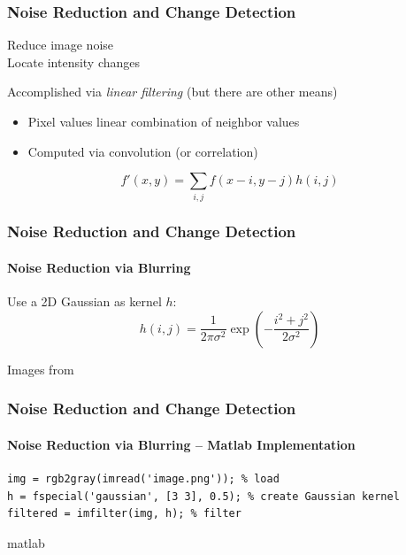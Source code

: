\documentclass[xetex,professionalfont]{beamer}
\begin{document}

\begin{frame}
\frametitle{Noise Reduction and Change Detection}

Reduce image noise\\\medskip
Locate intensity changes

\bigskip
Accomplished via \emph{linear filtering} (but there are other means)
\begin{itemize}
	\item Pixel values linear combination of neighbor values
	\item Computed via convolution (or correlation)
\end{itemize}

\[
f'(x,y) = \sum_{i,j}f(x-i,y-j)h(i,j) %
\]

\end{frame}


\begin{frame}
\frametitle{Noise Reduction and Change Detection}
\framesubtitle{Noise Reduction via Blurring}

Use a 2D Gaussian as kernel $h$:
\[
h(i,j)=\frac{1}{2\pi\sigma^2}\exp\left(-\frac{i^2+j^2}{2\sigma^2}\right)
\]

\begin{center}
	{\centering Images from \cite{prince12}}
\end{center}

\end{frame}


\begin{frame}[fragile]
\frametitle{Noise Reduction and Change Detection}
\framesubtitle{Noise Reduction via Blurring -- Matlab Implementation}

\begin{verbatim}
img = rgb2gray(imread('image.png')); % load
h = fspecial('gaussian', [3 3], 0.5); % create Gaussian kernel
filtered = imfilter(img, h); % filter
\end{verbatim}{matlab}

\end{frame}
\end{document}
